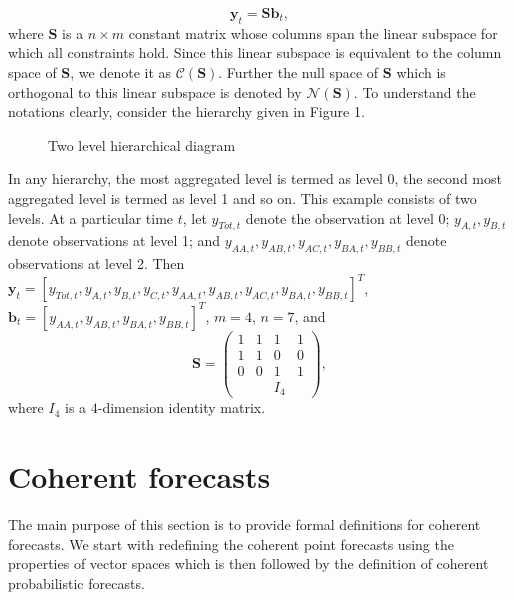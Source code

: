 \documentclass[a4paper, 11pt]{article}
\begin{document}
\begin{equation}
\mathbold{y}_t = \mathbold{Sb}_t,
\end{equation}
where $\mathbold{S}$ is a $n \times m$ constant matrix whose columns span the linear subspace for which all constraints hold. Since this linear subspace is equivalent to the column space of $\bm{S}$, we denote it as $\mathscr{C}(\bm{S})$. Further the null space of $\bm{S}$ which is orthogonal to this linear subspace is denoted by $\mathscr{N}(\bm{S})$. 
To understand the notations clearly, consider the hierarchy given in Figure 1.
\begin{figure}[H]
	\begin{center}
		  
		 
		\qobitree
	\end{center}
	\caption{Two level hierarchical diagram}
\end{figure}
\noindent
In any hierarchy, the most aggregated level is termed as level 0, the second most aggregated level is termed as level 1 and so on. This example consists of two levels. At a particular time $t$, let $y_{Tot,t}$ denote the observation at level 0; $y_{A,t}, y_{B,t} $ denote observations at level 1; and $y_{AA,t}, y_{AB,t}, y_{AC,t}, y_{BA,t}, y_{BB,t}$ denote observations at level 2. Then $\mathbold{y}_t = [y_{Tot,t},y_{A,t}, y_{B,t},y_{C,t},y_{AA,t}, y_{AB,t}, y_{AC,t}, y_{BA,t}, y_{BB,t}]^T$, \\$\mathbold{b}_t = [y_{AA,t}, y_{AB,t}, y_{BA,t}, y_{BB,t}]^T$, $m=4$, $n=7$, and $$ \mathbold{S} = \begin{pmatrix} 1& 1 &1 &1  \\ 1 &1 & 0 &0 \\   0&0  & 1 & 1 \\ & & I_4 &   \end{pmatrix}, $$ where $I_4$ is a $4$-dimension identity matrix. \\  


\section{Coherent forecasts}

The main purpose of this section is to provide formal definitions for coherent forecasts. We start with redefining the coherent point forecasts using the properties of vector spaces which is then followed by the definition of coherent probabilistic forecasts. 
\\
\end{document}
